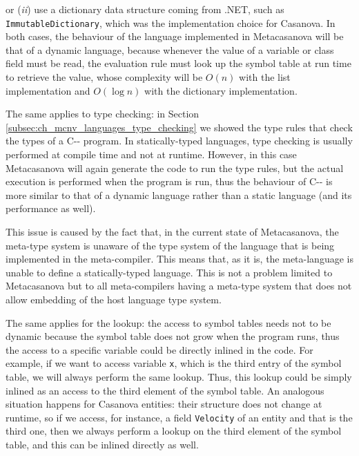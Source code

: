 \noindent
or (\textit{ii}) use a dictionary data structure coming from .NET, such as\\ \texttt{ImmutableDictionary}, which was the implementation choice for Casanova. In both cases, the behaviour of the language implemented in Metacasanova will be that of a dynamic language, because whenever the value of a variable or class field must be read, the evaluation rule must look up the symbol table at run time to retrieve the value, whose complexity will be $O(n)$ with the list implementation and $O(\log n)$ with the dictionary implementation.

The same applies to type checking: in Section \ref{subsec:ch_mcnv_languages_type_checking} we showed the type rules that check the types of a C-{}- program. In statically-typed languages, type checking is usually performed at compile time and not at runtime. However, in this case Metacasanova will again generate the code to run the type rules, but the actual execution is performed when the program is run, thus the behaviour of C-{}- is more similar to that of a dynamic language rather than a static language (and its performance as well).

This issue is caused by the fact that, in the current state of Metacasanova, the meta-type system is unaware of the type system of the language that is being implemented in the meta-compiler. This means that, as it is, the meta-language is unable to define a statically-typed language. This is not a problem limited to Metacasanova but to all meta-compilers having a meta-type system that does not allow embedding of the host language type system. 

The same applies for the lookup: the access to symbol tables needs not to be dynamic because the symbol table does not grow when the program runs, thus the access to a specific variable could be directly inlined in the code. For example, if we want to access variable \texttt{x}, which is the third entry of the symbol table, we will always perform the same lookup. Thus, this lookup could be simply inlined as an access to the third element of the symbol table. An analogous situation happens for Casanova entities: their structure does not change at runtime, so if we access, for instance, a field \texttt{Velocity} of an entity and that is the third one, then we always perform a lookup on the third element of the symbol table, and this can be inlined directly as well.

